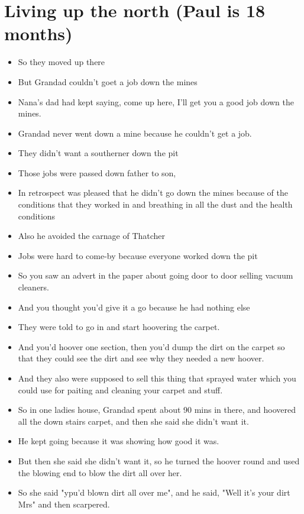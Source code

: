\documentclass[10pt,twocolumn,letterpaper]{article}
\begin{document}
\section{Living up the north (Paul is 18 months)}
\begin{itemize}
    \item So they moved up there
    \item But Grandad couldn't goet a job down the mines
    \item Nana's dad had kept saying, come up here, I'll get you a good job down the mines.
    \item Grandad never went down a mine because he couldn't get a job.
    \item They didn't want a southerner down the pit
    \item Those jobs were passed down father to son,
    \item In retrospect was pleased that he didn't go down the mines because of the conditions that they worked in and breathing in all the dust and the health conditions
    \item Also he avoided the carnage of Thatcher
    \item Jobs were hard to come-by because everyone worked down the pit
    \item So you saw an advert in the paper about going door to door selling vacuum cleaners.
    \item And you thought you'd give it a go because he had nothing else
    \item They were told to go in and start hoovering the carpet.
    \item And you'd hoover one section, then you'd dump the dirt on the carpet so that they could see the dirt and see why they needed a new hoover.
    \item And they also were supposed to sell this thing that sprayed water which you could use for paiting and cleaning your carpet and stuff.
    \item So in one ladies house, Grandad spent about 90 mins in there, and hoovered all the down stairs carpet, and then she said she didn't want it.
    \item He kept going because it was showing how good it was.
    \item But then she said she didn't want it, so he turned the hoover round and used the blowing end to blow the dirt all over her.
    \item So she said "ypu'd blown dirt all over me", and he said, "Well it's your dirt Mrs" and then scarpered.

\end{itemize}
\end{document}
